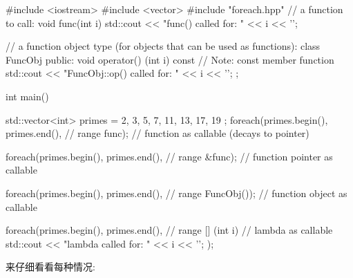 \begin{cpp}
#include <iostream>
#include <vector>
#include "foreach.hpp"
// a function to call:
void func(int i)
{
	std::cout << "func() called for: " << i << '\n';
}

// a function object type (for objects that can be used as functions):
class FuncObj {
	public:
	void operator() (int i) const { // Note: const member function
		std::cout << "FuncObj::op() called for: " << i << '\n';
	}
};

int main()
{
	std::vector<int> primes = { 2, 3, 5, 7, 11, 13, 17, 19 };
	foreach(primes.begin(), primes.end(), // range
			func); // function as callable (decays to pointer)

	foreach(primes.begin(), primes.end(), // range
			&func); // function pointer as callable

	foreach(primes.begin(), primes.end(), // range
			FuncObj()); // function object as callable

	foreach(primes.begin(), primes.end(), // range
			[] (int i) { // lambda as callable
				std::cout << "lambda called for: " << i << '\n';
			});
}
\end{cpp}

来仔细看看每种情况:

